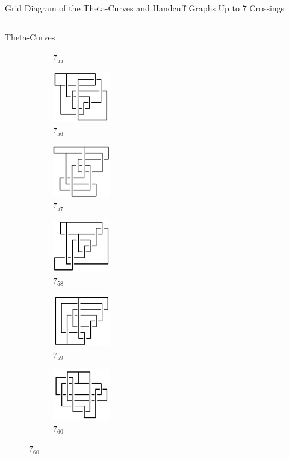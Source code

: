 \documentclass[final]{beamer}
\begin{document}
\begin{frame}[t]
\begin{alertblock}{Grid Diagram of the Theta-Curves and Handcuff Graphs Up to 7 Crossings}
\begin{columns}[t]
\begin{column}{0.7\textwidth}
\begin{alertblock}{Theta-Curves}
\begin{figure}
\begin{subfigure}{0.075\textwidth}
    \caption{$7_{55}$} 
    \end{subfigure}
    \begin{subfigure}{0.075\textwidth}
    \includegraphics[width=2.5cm]{../Midterm_Poster/grid_diagram/theta_7_56.png}
    \caption{$7_{56}$} 
    \end{subfigure}
    \begin{subfigure}{0.075\textwidth}
    \includegraphics[width=2.5cm]{../Midterm_Poster/grid_diagram/theta_7_57.png}
    \caption{$7_{57}$} 
    \end{subfigure}
    \begin{subfigure}{0.075\textwidth}
    \includegraphics[width=2.5cm]{../Midterm_Poster/grid_diagram/theta_7_58.png}
    \caption{$7_{58}$} 
    \end{subfigure}
    \begin{subfigure}{0.075\textwidth}
    \includegraphics[width=2.5cm]{../Midterm_Poster/grid_diagram/theta_7_59.png}
    \caption{$7_{59}$} 
    \end{subfigure}
    \begin{subfigure}{0.075\textwidth}
    \includegraphics[width=2.5cm]{../Midterm_Poster/grid_diagram/theta_7_60.png}
    \caption{$7_{60}$} 

\end{subfigure}
\end{figure}
\end{alertblock}
\end{column}
\end{columns}
\end{alertblock}
\end{frame}
\end{document}
